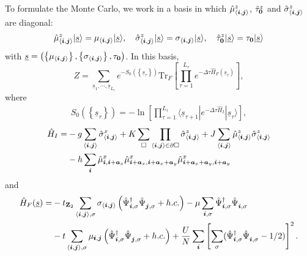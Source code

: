 To formulate the Monte Carlo, we work in a basis in which  $\hat{\mu}^{z}_{ \langle  \boldsymbol{i}, \boldsymbol{j} \rangle }$,  $ \hat{\tau}^{z}_{   \boldsymbol{0} } $  and  $ \hat{\sigma}^{z}_{ \langle  \boldsymbol{i}, \boldsymbol{j} \rangle }$    are diagonal: 
\begin{align}
	  \hat{\mu}^{z}_{ \langle  \boldsymbol{i}, \boldsymbol{j} \rangle } |  \underline{s} \rangle  =  \mu_{ \langle  \boldsymbol{i}, \boldsymbol{j} \rangle }   |  \underline{s} \rangle,\quad 
	 \hat{\sigma}^{z}_{ \langle  \boldsymbol{i}, \boldsymbol{j} \rangle }|  \underline{s} \rangle  =  \sigma_{ \langle  \boldsymbol{i}, \boldsymbol{j} \rangle } |  \underline{s} \rangle,\quad    
	  \hat{\tau}^{z}_{   \boldsymbol{0} }  |  \underline{s} \rangle   =  \tau_{  \boldsymbol{0} } |  \underline{s} \rangle
\end{align}
with $ \underline{s} = \left( \left\{  \mu_{ \langle  \boldsymbol{i}, \boldsymbol{j} \rangle }  \right\},  \left\{  \sigma_{ \langle  \boldsymbol{i}, \boldsymbol{j} \rangle }  \right\},  \tau_{\boldsymbol{0}}  \right) $. 
In this basis,
\begin{equation}
   Z  =  \sum_{\underline {s}_1, \cdots, \underline {s}_{L_{\tau}}}  e^{-S_0( \left\{ \underline{s}_\tau \right\})} \text{Tr}_F   \left[    \prod_{\tau=1}^{L_{\tau}} e^{- \Delta \tau \hat{H}_F(\underline{s}_{\tau}) } \right],
 \end{equation}
 where 
 \begin{align*}
 	 S_0( \left\{ \underline{s}_\tau \right\})  = - \ln  \left[  \prod_{\tau=1}^{L_{\tau}}    \langle \underline{s}_{\tau+1}   |  e^{-\Delta \tau   \hat{H}_I} |  \underline{s}_{\tau}  \rangle  \right], 
\end{align*}
\begin{align*}
         \hat{H}_I  = &  -g \sum_{\langle \boldsymbol{i}, \boldsymbol{j} \rangle } \hat{\sigma}^{x}_{\langle \boldsymbol{i}, \boldsymbol{j} \rangle }  +
	                        K \sum_{\square} \prod_{\langle \boldsymbol{i}, \boldsymbol{j} \rangle \in \partial \square} \hat{\sigma}^{z}_{\langle \boldsymbol{i}, \boldsymbol{j} \rangle}  
	     + J  \sum_{\langle \boldsymbol{i}, \boldsymbol{j} \rangle}  \hat{\mu}^z_{ \langle \pmb{i}, \boldsymbol{j} \rangle }  \hat{\sigma}^{z}_{\langle \boldsymbol{i}, \boldsymbol{j} \rangle}     \\
	     & -  h \sum_{ \boldsymbol{i} } \hat{\mu}^{x}_{\boldsymbol{i},\boldsymbol{i} + \boldsymbol{a}_x } \hat{\mu}^{x}_{\boldsymbol{i} + \boldsymbol{a}_x, \boldsymbol{i} + \boldsymbol{a}_x + \boldsymbol{a}_y }   \hat{\mu}^{x}_{\boldsymbol{i} + \boldsymbol{a}_x + \boldsymbol{a}_y, \boldsymbol{i} + \boldsymbol{a}_y}  	
\end{align*}
and 
 \begin{align*}
   \hat{H}_F(\underline{s})  = 
   	     & - t_{\Ztwo} \sum_{\langle \vec{i}, \vec{j} \rangle, \sigma } \sigma_{\langle \vec{i}, \vec{j} \rangle}
	\left(\hat{\Psi}^{\dagger}_{\vec{i},\sigma} \hat{\Psi}^{\phantom{\dagger}}_{\vec{j},\sigma}   + h.c. \right) - \mu \sum_{\vec{i},\sigma} \hat{\Psi}^{\dagger}_{\vec{i},\sigma} \hat{\Psi}^{\phantom{\dagger}}_{\vec{i},\sigma}  \\
         & - t  \sum_{\langle \vec{i}, \vec{j} \rangle, \sigma }   \mu_{\pmb{i},\ve{j}}    \left( \hat{\Psi}^{\dagger}_{\vec{i},\sigma} \hat{\Psi}^{\phantom{\dagger}}_{\vec{j},\sigma} 	+ h.c. \right)  
         +\frac{U}{N}\sum_{\ve{i}} \left[ \sum_{\sigma}  ( \hat{\Psi}^{\dagger}_{\ve{i},\sigma}  \hat{\Psi}^{\phantom\dagger}_{\ve{i},\sigma} - 1/2 ) \right]^2. 
 \end{align*}
